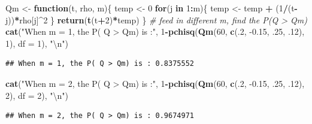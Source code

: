 \documentclass[11pt,]{article}
\newenvironment{Shaded}{\begin{snugshade}}{\end{snugshade}}
\newcommand{\CharTok}[1]{\textcolor[rgb]{0.31,0.60,0.02}{#1}}
\newcommand{\CommentTok}[1]{\textcolor[rgb]{0.56,0.35,0.01}{\textit{#1}}}
\newcommand{\ControlFlowTok}[1]{\textcolor[rgb]{0.13,0.29,0.53}{\textbf{#1}}}
\newcommand{\DataTypeTok}[1]{\textcolor[rgb]{0.13,0.29,0.53}{#1}}
\newcommand{\DecValTok}[1]{\textcolor[rgb]{0.00,0.00,0.81}{#1}}
\newcommand{\FloatTok}[1]{\textcolor[rgb]{0.00,0.00,0.81}{#1}}
\newcommand{\KeywordTok}[1]{\textcolor[rgb]{0.13,0.29,0.53}{\textbf{#1}}}
\newcommand{\NormalTok}[1]{#1}
\newcommand{\OperatorTok}[1]{\textcolor[rgb]{0.81,0.36,0.00}{\textbf{#1}}}
\newcommand{\StringTok}[1]{\textcolor[rgb]{0.31,0.60,0.02}{#1}}
\begin{document}
\begin{Shaded}
\begin{Highlighting}[]
\NormalTok{Qm <-}\StringTok{ }\ControlFlowTok{function}\NormalTok{(t, rho, m)\{}
\NormalTok{  temp <-}\StringTok{ }\DecValTok{0}
  \ControlFlowTok{for}\NormalTok{(j }\ControlFlowTok{in} \DecValTok{1}\OperatorTok{:}\NormalTok{m)\{}
\NormalTok{    temp <-}\StringTok{ }\NormalTok{temp }\OperatorTok{+}\StringTok{ }\NormalTok{(}\DecValTok{1}\OperatorTok{/}\NormalTok{(t}\OperatorTok{-}\NormalTok{j))}\OperatorTok{*}\NormalTok{rho[j]}\OperatorTok{^}\DecValTok{2}
\NormalTok{  \}}
  \KeywordTok{return}\NormalTok{(}\KeywordTok{t}\NormalTok{(t}\OperatorTok{+}\DecValTok{2}\NormalTok{)}\OperatorTok{*}\NormalTok{temp)}
\NormalTok{\}}
\CommentTok{# feed in different m, find the P(Q > Qm)}
\KeywordTok{cat}\NormalTok{(}\StringTok{"When m = 1, the P( Q > Qm) is :"}\NormalTok{, }
    \DecValTok{1}\OperatorTok{-}\KeywordTok{pchisq}\NormalTok{(}\KeywordTok{Qm}\NormalTok{(}\DecValTok{60}\NormalTok{, }\KeywordTok{c}\NormalTok{(.}\DecValTok{2}\NormalTok{, }\FloatTok{-0.15}\NormalTok{, }\FloatTok{.25}\NormalTok{, }\FloatTok{.12}\NormalTok{), }\DecValTok{1}\NormalTok{), }\DataTypeTok{df =} \DecValTok{1}\NormalTok{), }\StringTok{"}\CharTok{\textbackslash{}n}\StringTok{"}\NormalTok{)}
\end{Highlighting}
\end{Shaded}

\begin{verbatim}
## When m = 1, the P( Q > Qm) is : 0.8375552
\end{verbatim}

\begin{Shaded}
\begin{Highlighting}[]
\KeywordTok{cat}\NormalTok{(}\StringTok{"When m = 2, the P( Q > Qm) is :"}\NormalTok{, }
    \DecValTok{1}\OperatorTok{-}\KeywordTok{pchisq}\NormalTok{(}\KeywordTok{Qm}\NormalTok{(}\DecValTok{60}\NormalTok{, }\KeywordTok{c}\NormalTok{(.}\DecValTok{2}\NormalTok{, }\FloatTok{-0.15}\NormalTok{, }\FloatTok{.25}\NormalTok{, }\FloatTok{.12}\NormalTok{), }\DecValTok{2}\NormalTok{), }\DataTypeTok{df =} \DecValTok{2}\NormalTok{), }\StringTok{"}\CharTok{\textbackslash{}n}\StringTok{"}\NormalTok{)}
\end{Highlighting}
\end{Shaded}

\begin{verbatim}
## When m = 2, the P( Q > Qm) is : 0.9674971
\end{verbatim}
\end{document}
